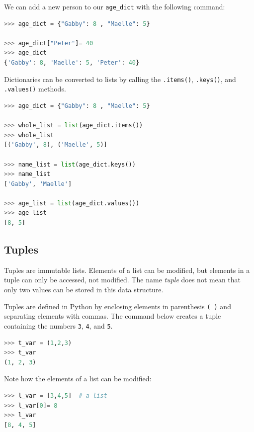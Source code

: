 \documentclass{book}
\begin{document}
We can add a new person to our \lstinline!age_dict! with the following
command:

\begin{lstlisting}[language=Python]
>>> age_dict = {"Gabby": 8 , "Maelle": 5}

>>> age_dict["Peter"]= 40
>>> age_dict
{'Gabby': 8, 'Maelle': 5, 'Peter': 40}
\end{lstlisting}

Dictionaries can be converted to lists by calling the
\lstinline!.items()!, \lstinline!.keys()!, and \lstinline!.values()!
methods.

\begin{lstlisting}[language=Python]
>>> age_dict = {"Gabby": 8 , "Maelle": 5}

>>> whole_list = list(age_dict.items())
>>> whole_list
[('Gabby', 8), ('Maelle', 5)]

>>> name_list = list(age_dict.keys())
>>> name_list
['Gabby', 'Maelle']

>>> age_list = list(age_dict.values())
>>> age_list
[8, 5]
\end{lstlisting}
    




    
        \subsection{Tuples}\label{tuples}
    




    
        Tuples are immutable lists. Elements of a list can be modified, but
elements in a tuple can only be accessed, not modified. The name
\emph{tuple} does not mean that only two values can be stored in this
data structure.

Tuples are defined in Python by enclosing elements in parenthesis
\lstinline!( )! and separating elements with commas. The command below
creates a tuple containing the numbers \lstinline!3!, \lstinline!4!, and
\lstinline!5!.

\begin{lstlisting}[language=Python]
>>> t_var = (1,2,3)
>>> t_var
(1, 2, 3)
\end{lstlisting}

Note how the elements of a list can be modified:

\begin{lstlisting}[language=Python]
>>> l_var = [3,4,5]  # a list
>>> l_var[0]= 8
>>> l_var
[8, 4, 5]
\end{lstlisting}
\end{document}

